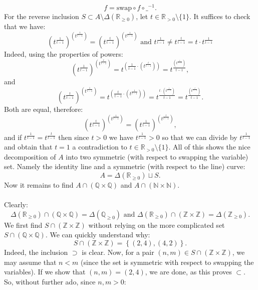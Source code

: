 \documentclass[11pt, a4paper, oneside]{article}
\theoremstyle{remark}
\theoremstyle{lemma}
\begin{document}
\[
f = \mathrm{swap} \circ f\circ\_^{-1}.
\]
For the reverse inclusion \( S \subset A \setminus \Delta\left(\mathbb{R}_{\geq 0}\right) \), let \( t \in \mathbb{R}_{> 0} \setminus \{1\} \). It suffices to check that we have:
\[
\left(t^{\frac{1}{t-1}}\right)^{\left(t^{\frac{t}{t-1}}\right)}=\left(t^{\frac{t}{t-1}}\right)^{\left(t^{\frac{1}{t-1}}\right)} \text{ and } t^{\frac{1}{t-1}} \neq t^{\frac{t}{t-1}}=t\cdot  t^{\frac{1}{t-1}} 
\]
Indeed, using the properties of powers:
\[
\left(t^{\frac{1}{t-1}}\right)^{\left(t^{\frac{t}{t-1}}\right)} = t^{\left(\frac{1}{t-1} \cdot \left(t^{\frac{t}{t-1}}\right)\right)} = t^{\frac{\left(t^{\frac{t}{t-1}}\right)}{t-1}},
\]
and
\[
\left(t^{\frac{t}{t-1}}\right)^{\left(t^{\frac{1}{t-1}}\right)} = t^{\left(\frac{t}{t-1} \cdot \left(t^{\frac{1}{t-1}}\right)\right)} = t^{\frac{t \cdot \left(t^{\frac{1}{t-1}}\right)}{t-1}} = t^{\frac{\left(t^{\frac{t}{t-1}}\right)}{t-1}}.
\]
Both are equal, therefore:
\[
\left(t^{\frac{t}{t-1}}\right)^{\left(t^{\frac{1}{t-1}}\right)} = \left(t^{\frac{1}{t-1}}\right)^{\left(t^{\frac{t}{t-1}}\right)},
\]
and if $t^{\frac{1}{t-1}}=t^{\frac{t}{t-1}} $ then since $t > 0$ we have $t^{\frac{1}{t-1}}>0$ so that we can divide by $t^{\frac{1}{t-1}}$ and obtain that $t=1$ a contradiction to $t\in\mathbb{R}_{>0}\setminus\{1\}$.
All of this shows the nice decomposition of $A$ into two symmetric (with respect to swapping the variable) set. Namely the identity line and a symmetric (with respect to the line) curve:
\[
A=\Delta(\mathbb{R}_{\geq 0}) \sqcup S.
\]
Now it remains to find \(A\cap\left(\mathbb{Q}\times\mathbb{Q}\right)\) and \(A\cap\left(\mathbb{N}\times\mathbb{N}\right)\).
\\\\
Clearly:
\[
\Delta(\mathbb{R}_{\geq 0})\cap\left(\mathbb{Q}\times\mathbb{Q}\right)=\Delta(\mathbb{Q}_{\geq 0})\text{ and } \Delta(\mathbb{R}_{\geq 0})\cap\left(\mathbb{Z}\times\mathbb{Z}\right)=\Delta(\mathbb{Z}_{\geq 0}).
\]
We first find \( S \cap \left( \mathbb{Z} \times \mathbb{Z} \right) \) without relying on the more complicated set \( S \cap \left( \mathbb{Q} \times \mathbb{Q} \right) \).  
We can quickly understand why:  
\[
S \cap \left( \mathbb{Z} \times \mathbb{Z} \right) = \left\{ \left( 2,4 \right), \left( 4,2 \right) \right\}.
\]
Indeed, the inclusion \( \supset \) is clear. Now, for a pair \( \left( n,m \right) \in S \cap \left( \mathbb{Z} \times \mathbb{Z} \right) \), we may assume that \( n < m \) (since the set is symmetric with respect to swapping the variables). If we show that \( \left( n,m \right) = \left( 2,4 \right) \), we are done, as this proves \( \subset \). So, without further ado, since \( n,m > 0 \):  
\end{document}
